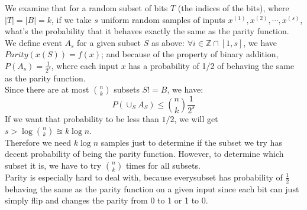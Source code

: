\documentclass[12pt]{article}
\begin{document}
\noindent We examine that for a random subset of bits $T$ (the indices of the bits), where $|T| = |B| = k$, if we take $s$ uniform random samples of inputs $x^{(1)}, x^{(2)}, \cdots, x^{(s)}$, what's the probability that it behaves exactly the same as the parity function.\\
\newline
We define event $A_s$ for a given subset $S$ as above: $\forall i \in \mathbb{Z} \cap [1, s]$, we have $Parity(x(S)) = f(x)$; and because of the property of binary addition, $P(A_s) = \frac{1}{2^s}$, where each input $x$ has a probability of 1/2 of behaving the same as the parity function.\\
\newline
Since there are at most $n \choose k$ subsets $S != B$, we have:
$$P(\cup_{S}A_{S}) \leq {n \choose k}\frac{1}{2^s}$$
If we want that probability to be less than $1/2$, we will get $s > \log{n \choose k} \approxeq k\log{n}$.\\
\newline
Therefore we need $k\log{n}$ samples just to determine if the subset we try has decent probability of being the parity function. However, to determine which subset it is, we have to try $n \choose k$ times for all subsets. \\
\newline
Parity is especially hard to deal with, because everysubset has probability of $\frac{1}{2}$ behaving the same as the parity function on a given input since each bit can just simply flip and changes the parity from 0 to 1 or 1 to 0.
\end{document}
